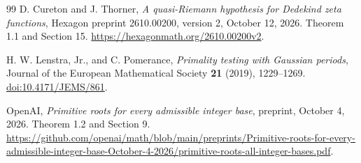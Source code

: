 \documentclass[11pt]{article}
\theoremstyle{definition}
\theoremstyle{remark}
\begin{document}
\begin{thebibliography}{99}
D. Cureton and J. Thorner,
\emph{A quasi-Riemann hypothesis for Dedekind zeta functions},
Hexagon preprint 2610.00200, version 2, October 12, 2026.
Theorem 1.1 and Section 15.
\url{https://hexagonmath.org/2610.00200v2}.

H. W. Lenstra, Jr., and C. Pomerance,
\emph{Primality testing with Gaussian periods},
Journal of the European Mathematical Society \textbf{21} (2019),
1229--1269.
\href{https://doi.org/10.4171/JEMS/861}{doi:10.4171/JEMS/861}.

OpenAI, \emph{Primitive roots for every admissible integer base},
preprint, October 4, 2026. Theorem 1.2 and Section 9.
\url{https://github.com/openai/math/blob/main/preprints/Primitive-roots-for-every-admissible-integer-base-October-4-2026/primitive-roots-all-integer-bases.pdf}.

\end{thebibliography}
\endgroup
\end{document}
